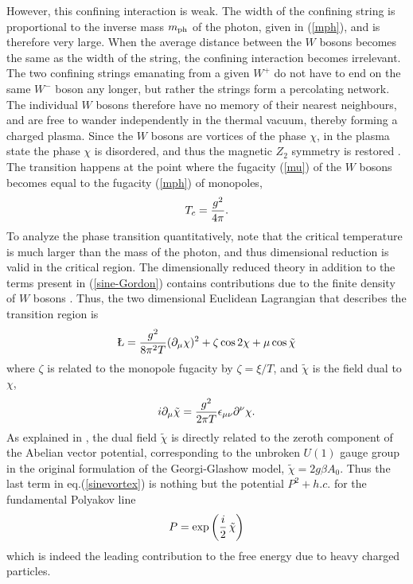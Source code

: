 \documentclass[a4paper,aps,prd,superscriptaddress,showpacs,showkeys]{revtex4}
\begin{document}
However, this confining interaction is weak. The
width of the confining string is proportional to the inverse mass $m_{\rm
ph}$ of the photon, given in (\ref{mph}), and is therefore very large.
When the average distance between the $W$ bosons becomes the same as the
width of the string, the confining interaction becomes irrelevant.
The two confining strings emanating from a given
$W^+$ do not have to end on the
same $W^-$ boson any longer, but rather the strings form a percolating
network.
The individual $W$ bosons therefore  have no memory of
their nearest neighbours, and
are free to wander independently in the thermal vacuum, thereby
forming a charged plasma.
Since the $W$ bosons are vortices of the phase $\chi$, in the plasma
state
the phase $\chi$ is disordered, and thus the magnetic $Z_2$ symmetry is
restored \cite{ka}. The transition happens at the point where the
fugacity
(\ref{mu}) of the $W$ bosons becomes equal to the fugacity (\ref{mph}) of
monopoles,
\begin{eqnarray}
T_c={g^2\over 4\pi} .
\end{eqnarray}
To analyze the phase transition quantitatively,  note that the
critical temperature is much larger than
the mass of the photon, and thus dimensional reduction is valid in the
critical region. The dimensionally reduced theory in addition
to the terms present in (\ref{sine-Gordon}) contains
contributions due to the finite density of $W$ bosons \cite{gg1}.
Thus, the two dimensional Euclidean Lagrangian that describes the
transition  region is
\begin{eqnarray}
\L = { g^2 \over 8 \pi^2 T } (\partial_{\mu}\chi)^2 +
\zeta\cos 2 \chi
+ \mu \cos \tilde{\chi}
\label{sinevortex}
\end{eqnarray}
where $\zeta$ is related to the monopole fugacity by $\zeta=\xi/T$, and
$\tilde \chi$ is the field dual to $\chi$,
\begin{eqnarray}
i\partial_{\mu}\tilde\chi= {g^2\over 2\pi T}
\epsilon_{\mu\nu}\partial^\nu \chi.
\label{chid}
\end{eqnarray}
As explained in \cite{gg1}, the dual field $\tilde \chi$ is directly
related to the zeroth component of the Abelian vector potential,
corresponding to the unbroken $U(1)$ gauge group in the original
formulation of the
Georgi-Glashow model, $\tilde\chi=2g\beta A_0$.
Thus the last term in eq.(\ref{sinevortex}) is nothing but the
potential $P^2+h.c.$ for the fundamental Polyakov line
\begin{eqnarray}
P=\exp\left({i\over 2}\,\tilde\chi\right)
\label{polyakovline}
\end{eqnarray}
which is indeed the leading contribution to the free energy due to heavy
charged particles.
\end{document}
